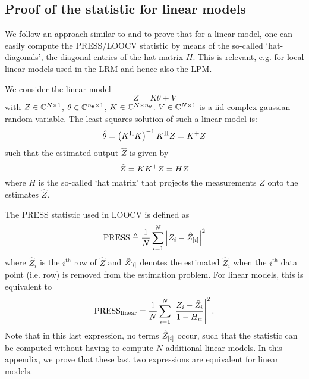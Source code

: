 \begin{subappendices}
  \section{Proof of the  statistic for linear models}

  We follow an approach similar to \citet{Hyndman2014LOOCV} and \citet[Section 12.3.2]{Seber2003} to prove that for a linear model, one can easily compute the \gls{PRESS}/\gls{LOOCV} statistic by means of the so-called `hat-diagonals', the diagonal entries of the hat matrix $H$.
  This is relevant, e.g. for local linear models used in the \gls{LRM} and hence also the \gls{LPM}.

  We consider the linear model
  \begin{equation}
    Z = K \theta + V
  \end{equation}
  with $Z \in \ComplexMatrix{N\times1}$, $\theta \in \ComplexMatrix{\nth \times 1}$, $K \in \ComplexMatrix{N \times \nth}$.
$V \in \ComplexMatrix{N \times 1}$ is a \gls{iid} complex gaussian random variable.
The least-squares solution of such a linear model is:
\begin{equation}
  \hat{\theta} = \left(K^{\HT} K \right)^{-1} K^{\HT} Z = \pinv{K} Z
\end{equation}
such that the estimated output $\hat{Z}$ is given by
\begin{equation}
  \hat{Z} = K \pinv{K} Z = H Z
\end{equation}
where $H$ is the so-called `hat matrix' that projects the measurements $Z$ onto the estimates $\hat{Z}$.

The \gls{PRESS} statistic used in \gls{LOOCV} is defined as~\citep[Chapter 12]{Seber2003}
\begin{equation}
  \PRESS \isdef 
    \frac{1}{N} 
      \sum_{i=1}^{N}
      \abs{
        Z_i - \ignoring{i}{\hat{Z}}
      }^2
\end{equation}
where $\hat{Z}_i$ is the $i^{\text{th}}$ row of $\hat{Z}$ and $\ignoring{i}{\hat{Z}}$ denotes the estimated $\hat{Z}_i$ when the $i^{\text{th}}$ data point (i.e. row) is removed from the estimation problem.
For linear models, this is equivalent to
\begin{equation}
  \PRESS_{\mathrm{linear}} = 
     \frac{1}{N}
     \sum_{i=1}^{N}
     \abs{
       \frac{Z_i - \hat{Z}_i}
                {1 - H_{ii}}
     }^2
     \text{.}
\end{equation}
Note that in this last expression, no terms $\ignoring{i}{\hat{Z}}$ occur, such that the statistic can be computed without having to compute $N$ additional linear models.
In this appendix, we prove that these last two expressions are equivalent for linear models.


\end{subappendices}
